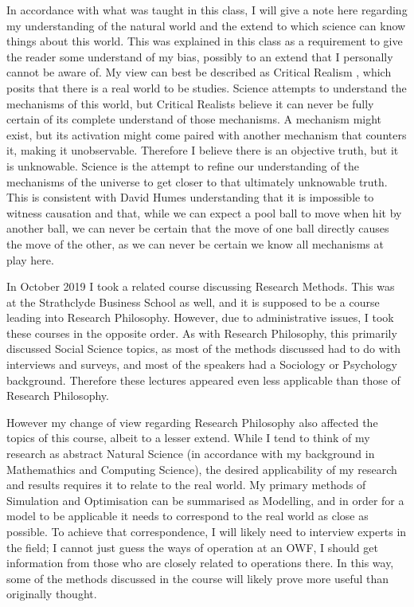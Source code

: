 \documentclass[a4paper,12pt]{article}
\begin{document}
In accordance with what was taught in this class, I will give a note here regarding my understanding of the natural world and the extend to which science can know things about this world. This was explained in this class as a requirement to give the reader some understand of my bias, possibly to an extend that I personally cannot be aware of. My view can best be described as Critical Realism \cite{bhaskar1998critical,archer2013critical}, which posits that there is a real world to be studies. Science attempts to understand the mechanisms of this world, but Critical Realists believe it can never be fully certain of its complete understand of those mechanisms. A mechanism might exist, but its activation might come paired with another mechanism that counters it, making it unobservable. Therefore I believe there is an objective truth, but it is unknowable. Science is the attempt to refine our understanding of the mechanisms of the universe to get closer to that ultimately unknowable truth. This is consistent with David Humes understanding that it is impossible to witness causation \cite{hume2016enquiry} and that, while we can expect a pool ball to move when hit by another ball, we can never be certain that the move of one ball directly causes the move of the other, as we can never be certain we know all mechanisms at play here. 

\bigskip

In October 2019 I took a related course discussing Research Methods. This was at the Strathclyde Business School as well, and it is supposed to be a course leading into Research Philosophy. However, due to administrative issues, I took these courses in the opposite order. As with Research Philosophy, this primarily discussed Social Science topics, as most of the methods discussed had to do with interviews and surveys, and most of the speakers had a Sociology or Psychology background. Therefore these lectures appeared even less applicable than those of Research Philosophy. 

However my change of view regarding Research Philosophy also affected the topics of this course, albeit to a lesser extend. While I tend to think of my research as abstract Natural Science (in accordance with my background in Mathemathics and Computing Science), the desired applicability of my research and results requires it to relate to the real world. My primary methods of Simulation and Optimisation can be summarised as Modelling, and in order for a model to be applicable it needs to correspond to the real world as close as possible. To achieve that correspondence, I will likely need to interview experts in the field; I cannot just guess the ways of operation at an OWF, I should get information from those who are closely related to operations there. In this way, some of the methods discussed in the course will likely prove more useful than originally thought. 
\end{document}
